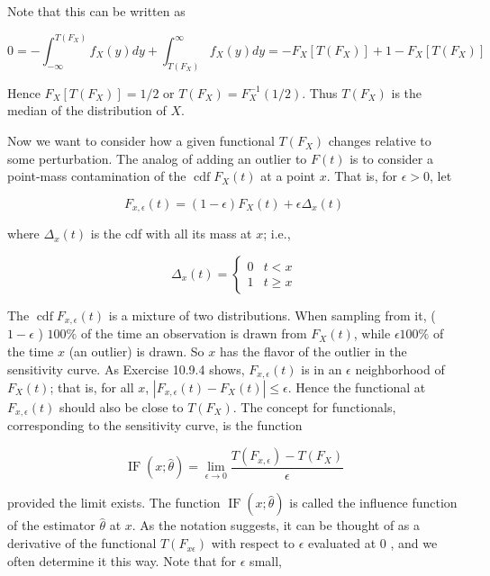 Note that this can be written as

$$
0=-\int_{-\infty}^{T\left(F_{X}\right)} f_{X}(y) d y+\int_{T\left(F_{X}\right)}^{\infty} f_{X}(y) d y=-F_{X}\left[T\left(F_{X}\right)\right]+1-F_{X}\left[T\left(F_{X}\right)\right]
$$

Hence $F_{X}\left[T\left(F_{X}\right)\right]=1 / 2$ or $T\left(F_{X}\right)=F_{X}^{-1}(1 / 2)$. Thus $T\left(F_{X}\right)$ is the median of the distribution of $X$.

Now we want to consider how a given functional $T\left(F_{X}\right)$ changes relative to some perturbation. The analog of adding an outlier to $F(t)$ is to consider a point-mass contamination of the $\operatorname{cdf} F_{X}(t)$ at a point $x$. That is, for $\epsilon>0$, let


\begin{equation*}
F_{x, \epsilon}(t)=(1-\epsilon) F_{X}(t)+\epsilon \Delta_{x}(t) \tag{10.9.13}
\end{equation*}


where $\Delta_{x}(t)$ is the cdf with all its mass at $x$; i.e.,

\[
\Delta_{x}(t)= \begin{cases}0 & t<x  \tag{10.9.14}\\ 1 & t \geq x\end{cases}
\]

The $\operatorname{cdf} F_{x, \epsilon}(t)$ is a mixture of two distributions. When sampling from it, ( $1-\epsilon$ ) $100 \%$ of the time an observation is drawn from $F_{X}(t)$, while $\epsilon 100 \%$ of the time $x$ (an outlier) is drawn. So $x$ has the flavor of the outlier in the sensitivity curve. As Exercise 10.9.4 shows, $F_{x, \epsilon}(t)$ is in an $\epsilon$ neighborhood of $F_{X}(t)$; that is, for all $x$, $\left|F_{x, \epsilon}(t)-F_{X}(t)\right| \leq \epsilon$. Hence the functional at $F_{x, \epsilon}(t)$ should also be close to $T\left(F_{X}\right)$. The concept for functionals, corresponding to the sensitivity curve, is the function


\begin{equation*}
\operatorname{IF}(x ; \widehat{\theta})=\lim _{\epsilon \rightarrow 0} \frac{T\left(F_{x, \epsilon}\right)-T\left(F_{X}\right)}{\epsilon} \tag{10.9.15}
\end{equation*}


provided the limit exists. The function $\operatorname{IF}(x ; \widehat{\theta})$ is called the influence function of the estimator $\widehat{\theta}$ at $x$. As the notation suggests, it can be thought of as a derivative of the functional $T\left(F_{x \epsilon}\right)$ with respect to $\epsilon$ evaluated at 0 , and we often determine it this way. Note that for $\epsilon$ small,

